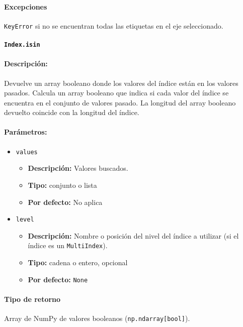     \paragraph{Excepciones}
    \texttt{KeyError} si no se encuentran todas las etiquetas en el eje seleccionado.



    \paragraph{\texttt{Index.isin}}

    \paragraph{Descripción:}
    Devuelve un array booleano donde los valores del índice están en los valores pasados. Calcula un array booleano que indica si cada valor del índice se encuentra en el conjunto de valores pasado. La longitud del array booleano devuelto coincide con la longitud del índice.

    \paragraph{Parámetros:}

    \begin{itemize}
        \item \texttt{values}
            \begin{itemize}
                \item \textbf{Descripción:} Valores buscados.
                \item \textbf{Tipo:} conjunto o lista
                \item \textbf{Por defecto:} No aplica
            \end{itemize}
        \item \texttt{level}
            \begin{itemize}
                \item \textbf{Descripción:} Nombre o posición del nivel del índice a utilizar (si el índice es un \texttt{MultiIndex}).
                \item \textbf{Tipo:} cadena o entero, opcional
                \item \textbf{Por defecto:} \texttt{None}
            \end{itemize}
    \end{itemize}

    \paragraph{Tipo de retorno}
    Array de NumPy de valores booleanos (\texttt{np.ndarray[bool]}).

